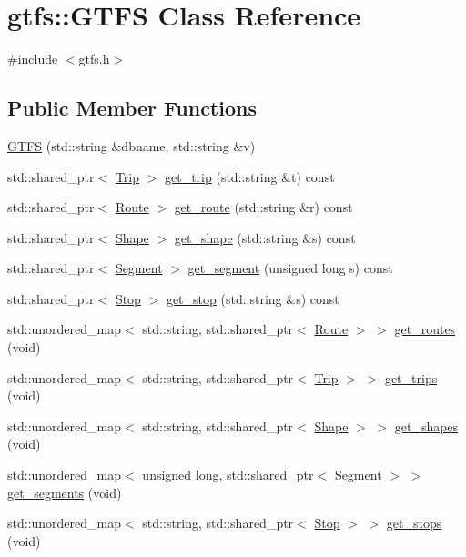 \hypertarget{classgtfs_1_1GTFS}{}\section{gtfs\+:\+:G\+T\+FS Class Reference}
\label{classgtfs_1_1GTFS}


{\ttfamily \#include $<$gtfs.\+h$>$}

\subsection*{Public Member Functions}
\begin{DoxyCompactItemize}
\item 
\hyperlink{classgtfs_1_1GTFS_abe065541610fe5d9673bc4befd0bcf94}{G\+T\+FS} (std\+::string \&dbname, std\+::string \&v)
\item 
std\+::shared\+\_\+ptr$<$ \hyperlink{classgtfs_1_1Trip}{Trip} $>$ \hyperlink{classgtfs_1_1GTFS_aec86fae3dee1e13f541798266fb2317e}{get\+\_\+trip} (std\+::string \&t) const
\item 
std\+::shared\+\_\+ptr$<$ \hyperlink{classgtfs_1_1Route}{Route} $>$ \hyperlink{classgtfs_1_1GTFS_a47cfbb8ca6cb8986e95f1038dcc7c04b}{get\+\_\+route} (std\+::string \&r) const
\item 
std\+::shared\+\_\+ptr$<$ \hyperlink{classgtfs_1_1Shape}{Shape} $>$ \hyperlink{classgtfs_1_1GTFS_a59d1a7209999120b2446298f9fac4564}{get\+\_\+shape} (std\+::string \&s) const
\item 
std\+::shared\+\_\+ptr$<$ \hyperlink{classgtfs_1_1Segment}{Segment} $>$ \hyperlink{classgtfs_1_1GTFS_afb9b3152a524f393c4414611dbeeba48}{get\+\_\+segment} (unsigned long s) const
\item 
std\+::shared\+\_\+ptr$<$ \hyperlink{classgtfs_1_1Stop}{Stop} $>$ \hyperlink{classgtfs_1_1GTFS_a34304835b203901a972d40cc4f1d060a}{get\+\_\+stop} (std\+::string \&s) const
\item 
std\+::unordered\+\_\+map$<$ std\+::string, std\+::shared\+\_\+ptr$<$ \hyperlink{classgtfs_1_1Route}{Route} $>$ $>$ \hyperlink{classgtfs_1_1GTFS_aef6a88c15cdf8bf788e41c81a14ecc76}{get\+\_\+routes} (void)
\item 
std\+::unordered\+\_\+map$<$ std\+::string, std\+::shared\+\_\+ptr$<$ \hyperlink{classgtfs_1_1Trip}{Trip} $>$ $>$ \hyperlink{classgtfs_1_1GTFS_ad526fc627fe1ce81b8a669f6187be0c0}{get\+\_\+trips} (void)
\item 
std\+::unordered\+\_\+map$<$ std\+::string, std\+::shared\+\_\+ptr$<$ \hyperlink{classgtfs_1_1Shape}{Shape} $>$ $>$ \hyperlink{classgtfs_1_1GTFS_a91ada6a3f02e3ee9b6a723a6c6fc50af}{get\+\_\+shapes} (void)
\item 
std\+::unordered\+\_\+map$<$ unsigned long, std\+::shared\+\_\+ptr$<$ \hyperlink{classgtfs_1_1Segment}{Segment} $>$ $>$ \hyperlink{classgtfs_1_1GTFS_ae124db38217498c5e1090447ccf11953}{get\+\_\+segments} (void)
\item 
std\+::unordered\+\_\+map$<$ std\+::string, std\+::shared\+\_\+ptr$<$ \hyperlink{classgtfs_1_1Stop}{Stop} $>$ $>$ \hyperlink{classgtfs_1_1GTFS_a33a81248120e12d5a5d52a92821b827e}{get\+\_\+stops} (void)
\end{DoxyCompactItemize}


